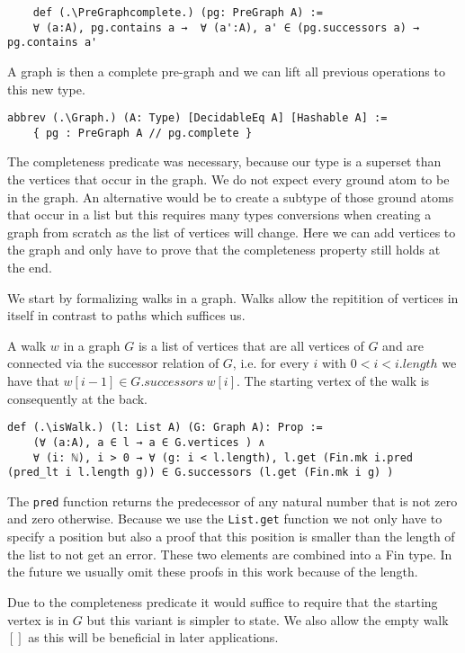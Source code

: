 \begin{lstlisting}
    def (.\PreGraphcomplete.) (pg: PreGraph A) := 
    ∀ (a:A), pg.contains a →  ∀ (a':A), a' ∈ (pg.successors a) → pg.contains a'
\end{lstlisting}

A graph is then a complete pre-graph and we can lift all previous operations to this new type.
\begin{lstlisting}
abbrev (.\Graph.) (A: Type) [DecidableEq A] [Hashable A] := 
    { pg : PreGraph A // pg.complete }
\end{lstlisting}

The completeness predicate was necessary, because our type is a superset than the vertices that occur in the graph. We do not expect every ground atom to be in the graph. An alternative would be to create a subtype of those ground atoms that occur in a list but this requires many types conversions when creating a graph from scratch as the list of vertices will change. Here we can add vertices to the graph and only have to prove that the completeness property still holds at the end.

We start by formalizing walks in a graph. Walks allow the repitition of vertices in itself in contrast to paths which suffices us.

A walk $w$ in a graph $G$ is a list of vertices that are all vertices of $G$ and are connected via the successor relation of $G$, i.e. for every $i$ with $0 < i < i.length$ we have that $w[i-1] \in G.successors\ w[i]$. The starting vertex of the walk is consequently at the back.

\begin{lstlisting}
def (.\isWalk.) (l: List A) (G: Graph A): Prop :=
    (∀ (a:A), a ∈ l → a ∈ G.vertices ) ∧ 
    ∀ (i: ℕ), i > 0 → ∀ (g: i < l.length), l.get (Fin.mk i.pred (pred_lt i l.length g)) ∈ G.successors (l.get (Fin.mk i g) )
\end{lstlisting}

The \lstinline|pred| function returns the predecessor of any natural number that is not zero and zero otherwise. Because we use the \lstinline|List.get| function we not only have to specify a position but also a proof that this position is smaller than the length of the list to not get an error. These two elements are combined into a Fin type. In the future we usually omit these proofs in this work because of the length.

Due to the completeness predicate it would suffice to require that the starting vertex is in $G$ but this variant is simpler to state. We also allow the empty walk $[]$ as this will be beneficial in later applications.

